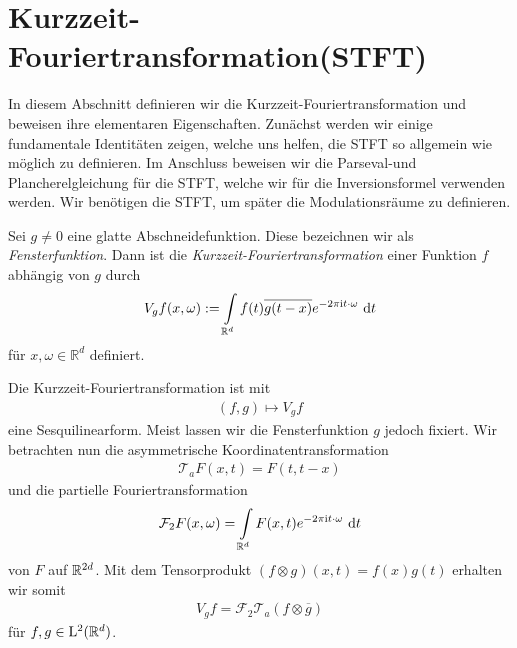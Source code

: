 \section{Kurzzeit-Fouriertransformation(STFT)}

In diesem Abschnitt definieren wir die Kurzzeit-Fouriertransformation und beweisen 
ihre elementaren Eigenschaften.
Zunächst werden wir einige fundamentale Identitäten zeigen, welche uns helfen, die STFT so allgemein wie möglich zu definieren. 
Im Anschluss beweisen wir die Parseval-und Plancherelgleichung für die STFT, welche wir für die Inversionsformel verwenden werden.
Wir benötigen die STFT, um später die Modulationsräume zu definieren.


\begin{df}
	Sei $g \neq 0$ eine glatte Abschneidefunktion.
	Diese bezeichnen wir als \textit{Fensterfunktion}.
	Dann ist die \textit{Kurzzeit-Fouriertransformation} einer Funktion $f$ abhängig von $g$ durch
	\begin{align*}
	V_g f(x, \omega) 
	:=
	\int \limits_{\mathbb{R}^d}
	f(t) \overline{g (t-x) }  e^{-2\pi \mathrm{i} t\cdot \omega }\text{ d} t
	\end{align*}
	für $x, \omega \in \mathbb{R}^d$ definiert.
\end{df}\noindent
Die Kurzzeit-Fouriertransformation ist mit 
\begin{align*}
(f,g) \mapsto V_g f
\end{align*}
eine Sesquilinearform. Meist lassen wir die Fensterfunktion $g$ jedoch fixiert.
Wir betrachten nun die asymmetrische Koordinatentransformation
\begin{align*}
\mathcal{T}_a F(x,t) = F(t,t-x)
\end{align*}
und die partielle Fouriertransformation
\begin{align*}
\mathcal{F}_2 F(x, \omega)
= 
\int \limits_{\mathbb{R}^d} F(x,t) e^{- 2 \pi \textrm{i} t \cdot \omega} \text{ d} t
\end{align*}
von $F$ auf $\mathbb{R}^{2d}$.
Mit dem Tensorprodukt $(f \otimes g) (x,t) = f(x) g(t)$ erhalten wir somit
\begin{align*}
V_g f = \mathcal{F}_2 \mathcal{T}_a(f \otimes \overline{g})
\end{align*}
für $f, g \in \mathrm{L}^2(\mathbb{R}^d)$.
\newpage
